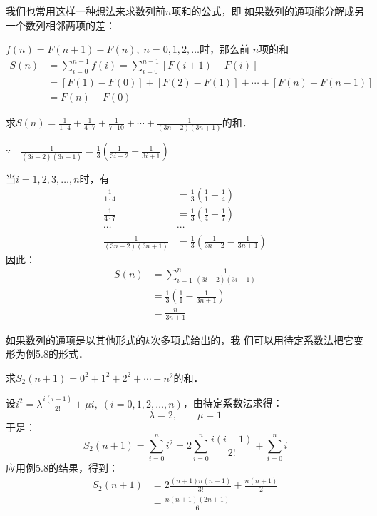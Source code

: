 我们也常用这样一种想法来求数列前$n$项和的公式，即
如果数列的通项能分解成另一个数列相邻两项的差：

$f(n)=F(n+1)-F(n),\; n=0,1,2,\ldots$时，那么前
$n$项的和
\[\begin{split}
   S(n)&= \sum^{n-1}_{i=0} f(i)= \sum^{n-1}_{i=0} [F(i+1)-F(i)]\\
   &=[F(1)-F(0)]+[F(2)-F(1)]+\cdots +[F(n)-F(n-1)]\\
   &=F(n)-F(0)
\end{split}\]


\begin{example}
    求$S(n)=\frac{1}{1\cdot 4}+\frac{1}{4\cdot 7}+\frac{1}{7\cdot 10}+\cdots +\frac{1}{(3n-2)(3n+1)}$的和．
\end{example}

\begin{solution}
$\because\quad \frac{1}{(3i-2)(3i+1)}=\frac{1}{3}\left(\frac{1}{3i-2}-\frac{1}{3i+1}\right)$

当$i=1,2,3,\ldots,n$时，有
\[\begin{split}
    \frac{1}{1\cdot 4}&=\frac{1}{3}\left(\frac{1}{1}-\frac{1}{4}\right)\\
    \frac{1}{4\cdot 7}&=\frac{1}{3}\left(\frac{1}{4}-\frac{1}{7}\right)\\
    \cdots &\cdots\\
    \frac{1}{(3n-2)(3n+1)}&=\frac{1}{3}\left(\frac{1}{3n-2}-\frac{1}{3n+1}\right)
\end{split}\]
因此：
\[\begin{split}
    S(n)&=\sum^n_{i=1}\frac{1}{(3i-2)(3i+1)}\\
    &=\frac{1}{3}\left(\frac{1}{1}-\frac{1}{3n+1}\right)\\
    &=\frac{n}{3n+1}
\end{split}\]
\end{solution}

如果数列的通项是以其他形式的$k$次多项式给出的，我
们可以用待定系数法把它变形为例5.8的形式．


\begin{example}
    求$S_2(n+1)=0^2+1^2+2^2+\cdots+n^2$的和．
\end{example}

\begin{solution}
    设$i^2=\lambda \frac{i(i-1)}{2!}+\mu i,\; (i=0,1,2,\ldots,n)$，由待定系数法求得：
\[\lambda=2,\qquad \mu=1\]
于是：
\[S_2(n+1)=\sum^n_{i=0}i^2=2\sum^n_{i=0}\frac{i(i-1)}{2!}+\sum^n_{i=0}i\]
应用例5.8的结果，得到：
\[\begin{split}
    S_2(n+1)&=2\frac{(n+1)n(n-1)}{3!}+\frac{n(n+1)}{2}\\
    &=\frac{n(n+1)(2n+1)}{6}
\end{split}\]
\end{solution}

